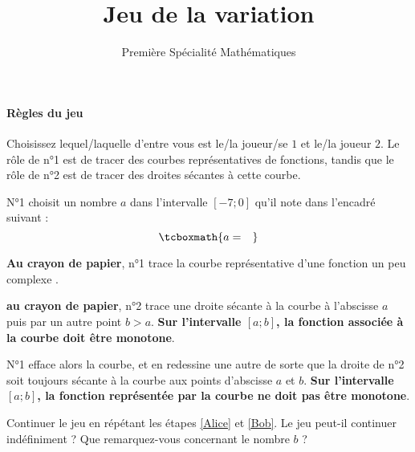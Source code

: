 \documentclass{exos}
\title{\vspace{-2cm}Jeu de la variation}
\date{}
\author{Première Spécialité Mathématiques}
\begin{document}
\maketitle
\begin{exercize*}
\hfill

\begin{center}
\end{center}

\paragraph*{Règles du jeu}

\begin{alphaquestions}
\item Choisissez lequel/laquelle d'entre vous est le/la joueur/se $1$ et le/la joueur $2$. Le rôle de n°1 est de tracer des courbes représentatives de fonctions, tandis que le rôle de n°2 est de tracer des droites sécantes à cette courbe.
\item N°1 choisit un nombre $a$ dans l'intervalle $[-7;0]$ qu'il note dans l'encadré suivant :
\begin{equation*}
\tcboxmath{a = \quad} 
\end{equation*}
\item \textbf{Au crayon de papier}, n°1 trace la courbe représentative d'une fonction \og un peu complexe \fg.
\item\label{Alice} \textbf{au crayon de papier}, n°2 trace une droite sécante à la courbe à l'abscisse $a$ puis par un autre point $b > a$. \textbf{Sur l'intervalle $[a;b]$, la fonction associée à la courbe doit être monotone}.
\item\label{Bob} N°1 efface alors la courbe, et en redessine une autre de sorte que la droite de n°2 soit toujours sécante à la courbe aux points d'abscisse $a$ et $b$. \textbf{Sur l'intervalle $[a;b]$, la fonction représentée par la courbe ne doit pas être monotone}.
\item Continuer le jeu en répétant les étapes \ref{Alice} et \ref{Bob}. Le jeu peut-il continuer indéfiniment ? Que remarquez-vous concernant le nombre $b$ ?
\end{alphaquestions}

\end{exercize*}
\end{document}
